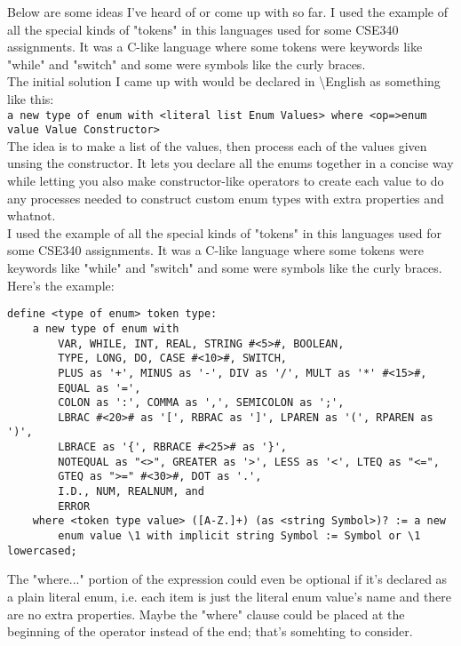 \documentclass{article}
\newcommand{\name}{\textbackslash{}English}
\newenvironment{typewritertext}{\ttfamily}{\par}
\begin{document}
\indent Below are some ideas I've heard of or come up with so far. I used the example of all the special kinds of "tokens" in this languages used for some CSE340 assignments. It was a C-like language where some tokens were keywords like "while" and "switch" and some were symbols like the curly braces.\\
\indent The initial solution I came up with would be declared in \name{} as something like this:\\
	\indent \verb!a new type of enum with <literal list Enum Values> where <op=>enum value Value Constructor>!\\
The idea is to make a list of the values, then process each of the values given unsing the constructor. It lets you declare all the enums together in a concise way while letting you also make constructor-like operators to create each value to do any processes needed to construct custom enum types with extra properties and whatnot.\\
\indent I used the example of all the special kinds of "tokens" in this languages used for some CSE340 assignments. It was a C-like language where some tokens were keywords like "while" and "switch" and some were symbols like the curly braces. Here's the example:\\
	\begin{typewritertext}
	\small
	\begin{lstlisting}
define <type of enum> token type:
	a new type of enum with
		VAR, WHILE, INT, REAL, STRING #<5>#, BOOLEAN,
		TYPE, LONG, DO, CASE #<10>#, SWITCH,
		PLUS as '+', MINUS as '-', DIV as '/', MULT as '*' #<15>#, 
		EQUAL as '=', 
		COLON as ':', COMMA as ',', SEMICOLON as ';',
		LBRAC #<20># as '[', RBRAC as ']', LPAREN as '(', RPAREN as ')', 
		LBRACE as '{', RBRACE #<25># as '}',
		NOTEQUAL as "<>", GREATER as '>', LESS as '<', LTEQ as "<=", 
		GTEQ as ">=" #<30>#, DOT as '.',
		I.D., NUM, REALNUM, and
		ERROR 
	where <token type value> ([A-Z.]+) (as <string Symbol>)? := a new 
		enum value \1 with implicit string Symbol := Symbol or \1 lowercased;
	\end{lstlisting}
	\end{typewritertext}
\indent The "where..." portion of the expression could even be optional if it's declared as a plain literal enum, i.e. each item is just the literal enum value's name and there are no extra properties. Maybe the "where" clause could be placed at the beginning of the operator instead of the end; that's somehting to consider.
\end{document}
